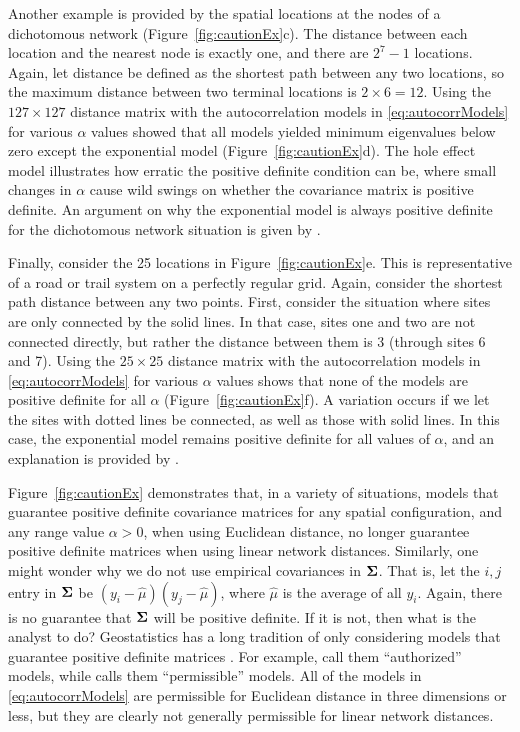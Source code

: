 \documentclass[11pt, titlepage]{article}\usepackage[]{graphicx}\usepackage[]{color}
\begin{document}
\begin{spacing}{1.9}
\begin{flushleft}
Another example is provided by the spatial locations at the nodes of a dichotomous network (Figure~\ref{fig:cautionEx}c). The distance between each location and the nearest node is exactly one, and there are $2^7 - 1$ locations.  Again, let distance be defined as the shortest path between any two locations, so the maximum distance between two terminal locations is $2 \times 6 = 12$.  Using the $127 \times 127$ distance matrix with the autocorrelation models in \ref{eq:autocorrModels} for various $\alpha$ values showed that all models yielded minimum eigenvalues below zero except the exponential model (Figure~\ref{fig:cautionEx}d).  The hole effect model illustrates how erratic the positive definite condition can be, where small changes in $\alpha$ cause wild swings on whether the covariance matrix is positive definite. An argument on why the exponential model is always positive definite for the dichotomous network situation is given by \citet{Ver:Pete:Move:2010}.

Finally, consider the 25 locations in Figure~\ref{fig:cautionEx}e.  This is representative of a road or trail system on a perfectly regular grid.  Again, consider the shortest path distance between any two points.  First, consider the situation where sites are only connected by the solid lines.  In that case, sites one and two are not connected directly, but rather the distance between them is 3 (through sites 6 and 7).  Using the $25 \times 25$ distance matrix with the autocorrelation models in \ref{eq:autocorrModels} for various $\alpha$ values shows that none of the models are positive definite for all $\alpha$ (Figure~\ref{fig:cautionEx}f). A variation occurs if we let the sites with dotted lines be connected, as well as those with solid lines.  In this case, the exponential model remains positive definite for all values of $\alpha$, and an explanation is provided by \citet{Curr:NonE:2006}.

Figure~\ref{fig:cautionEx} demonstrates that, in a variety of situations, models that guarantee positive definite covariance matrices for any spatial configuration, and any range value $\alpha > 0$, when using Euclidean distance, no longer guarantee positive definite matrices when using linear network distances. Similarly, one might wonder why we do not use empirical covariances in $\mbox{\boldmath $\Sigma$}$.  That is, let the $i,j$ entry in $\mbox{\boldmath $\Sigma$}$ be $(y_i - \hat{\mu})(y_j - \hat{\mu})$, where $\hat{\mu}$ is the average of all $y_i$.  Again, there is no guarantee that $\mbox{\boldmath $\Sigma$}$ will be positive definite.  If it is not, then what is the analyst to do? Geostatistics has a long tradition of only considering models that guarantee positive definite matrices \citep[][p. 161]{Jour:Huij:mini:1978}. For example, \citet[][p. 80]{Webs:Oliv:geos:2007} call them ``authorized'' models, while \citet[][p. 87]{Goov:geos:1997} calls them ``permissible'' models.  All of the models in \ref{eq:autocorrModels} are permissible for Euclidean distance in three dimensions or less, but they are clearly not generally permissible for linear network distances.


\end{flushleft}
\end{spacing}
\end{document}
